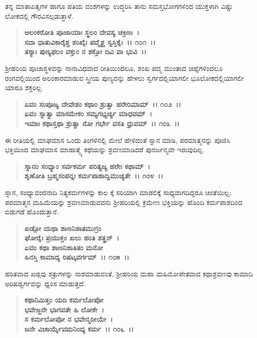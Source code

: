 ತನ್ನ ಮಾತಾಪಿತೃಗಳ ಹಾಗೂ ಪತಿಯ ವಂಶಗಳನ್ನು ಉದ್ಧರಿಸಿ ತಾನು ಸಮಸ್ತಭೋಗಗಳಿಂದ ಯುಕ್ತಳಾಗಿ ವಿಷ್ಣು ಲೋಕದಲ್ಲಿ ಗೌರವಿಸಲ್ಪಡುತ್ತಾಳೆ.

\begin{verse}
\textbf{ಅಲಂಕರೋತಿ ಪೂಜಾಯಾಃ ಸ್ಥಲಂ ದೇವಸ್ಯ ಚಕ್ರಿಣಃ~।}\\\textbf{ಸದಾ ಧಾತುವಿಕಾರೈಶ್ಚ ಶಂಖೈಃ ಪದ್ಮೈಶ್ಚ ಸ್ವಸ್ತಿಕೈಃ~।। ೧೦೧~।।}\\\textbf{ತಸ್ಯಾಃ ಪುಣ್ಯಫಲಂ ವಕ್ತುಂ ನ ಶಕ್ತೋ ದಿವಿ ವಾ ಭುವಿ~।।}
\end{verse}

ಶ‍್ರೀಹರಿಯ ಪೂಜಾಸ್ಥಳವನ್ನು ನಾನಾವಿಧವಾದ ರೀತಿಯಿಂದಲೂ, ಶಂಖ ಪದ್ಮ ಮುಂತಾದ ಚಿಹ್ನೆಗಳಿಂದಲೂ ರಂಗವಲ್ಲಿಯಿಂದ ಅಲಂಕಾರಮಾಡುವ ಸ್ತ್ರೀಯ ಪುಣ್ಯವನ್ನು ಹೇಳಲು ಸ್ವರ್ಗದಲ್ಲಿಯಾಗಲೀ ಭೂಲೋಕದಲ್ಲಿಯಾಗಲೀ ಯಾರೂ ಶಕ್ತರಿಲ್ಲ.

\begin{verse}
\textbf{ಏವಂ ಸಂಪೂಜ್ಯ ದೇವೇಶಂ ಕಥಾಂ ಶ್ರುತ್ವಾ ಹರೇರಿಮಾಮ್~।। ೧೦೨~।।}\\\textbf{ಏವಂ ಸ್ನಾತ್ವಾ ಮಾಸಮೇಕಂ ಸಮ್ಯಗಭ್ಯರ್ಚ್ಯ ಮಾಧವಮ್~।}\\\textbf{ಇಮಾಃ ಕಥಾಸ್ತಥಾ ಶ್ರುತ್ವಾ ನೋ ಗರ್ಭೇ ವಸತಿ ಧ್ರುವಮ್~।। ೧೦೩~।।}
\end{verse}

ಈ ರೀತಿಯಲ್ಲಿ ಮಾಘಮಾಸ ಒಂದು ತಿಂಗಳಿನಲ್ಲಿ ಮೇಲೆ ಹೇಳಿದಂತೆ ಸ್ನಾನ ಮಾಡಿ, ಪರಮಾತ್ಮನನ್ನು ಪೂಜಿಸಿ ಭಕ್ತಿಯಿಂದ ಮಾಘಮಾಸ ಮಾಹಾತ್ಮ್ಯೆ ಕಥೆಯನ್ನು ಶ್ರವಣಮಾಡಿದರೆ ಪುನರ್ಜನ್ಮವೇ ಇರುವುದಿಲ್ಲ.

\begin{verse}
\textbf{ಸ್ನಾನಂ ಸಂಧ್ಯಾಂ ಸರ್ವಕರ್ಮ ಪರಿತ್ಯಜ್ಯ ಹರೇಃ ಕಥಾಮ್~।}\\\textbf{ಶೃಣೋತಿ ಬ್ರಹ್ಮಸಂಪನ್ನಃ ಕರ್ಮಪಾಶಾದ್ವಿಮುಚ್ಯತೇ~।। ೧೦೪~।।}
\end{verse}

ಸ್ನಾನ, ಸಂಧ್ಯಾವಂದನಾದಿ ನಿತ್ಯಕರ್ಮಗಳನ್ನು ಕಾಲ ಕ್ಕೆ ಸರಿಯಾಗಿ ಮಾಡಲಿಕ್ಕೆ ಸಾಧ್ಯವಾಗದಿದ್ದರೂ ಚಿಂತೆಯಿಲ್ಲ; ಪರಮಾತ್ಮನ ಮಹಿಮೆಯನ್ನು ಶ್ರವಣಮಾಡುವವನು ಶ‍್ರೀಹರಿಯಲ್ಲಿ ಕ್ರಮೇಣ ಭಕ್ತಿಯನ್ನು ಹೊಂದಿ ಕರ್ಮಪಾಶದಿಂದ ಬಿಡುಗಡೆ ಹೊಂದುತ್ತಾನೆ.

\begin{verse}
\textbf{ಖಡ್ಗೋ ಯಥಾ ಶಾಣನಿಶಾತಮುಗ್ರಂ}\\\textbf{ಘೋರೈಃ ಪ್ರಯುಕ್ತಂ ಖಲು ಹಂತಿ ಶತೄನ್~। }\\\textbf{ಏವಂ ಕಥಾ ಶಾಣನಿಶಾತಿತಂ ಮನೋ} \\\textbf{ಹಿನಸ್ತಿ ಕಾಮಾದ್ಯ ರಿಷಟ್ಕವರ್ಗಮ್~।। ೧೦೫~।।}
\end{verse}

ಹರಿತವಾದ ಖಡ್ಗವು ಶತ್ರುಗಳನ್ನು ನಾಶಮಾಡುವಂತೆ, ಶ‍್ರೀಹರಿಯ ಮಹಾ ಮಹಿಮೋಪೇತವಾದ ಕಥಾಶ್ರವಣವು ಕಾಮಾದಿ ಅರಿಷಡ್ವರ್ಗವನ್ನು ಧ್ವಂಸ ಮಾಡುತ್ತದೆ.

\begin{verse}
\textbf{ಕಥಾನಿಮಿತ್ತಂ ಯದಿ ಕರ್ಮಲೋಪೋ}\\\textbf{ಭವೇಜ್ಜನೇ ಭಾಗವತೇ ಹಿ ಲೋಕೇ~। }\\\textbf{ಸ ಕರ್ಮಲೋಪೋ ನ ಭವೇನ್ಮದೀಯೇ~।} \\\textbf{ಜನೇ ವಿಚಾರ್ಯೈವಮನಿಂದ್ಯ ಕರ್ಮ~।। ೧೦೬~।।}
\end{verse}

